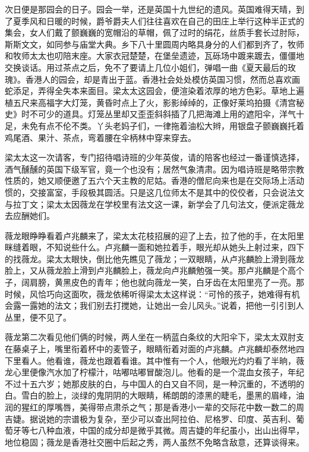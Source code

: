 \par 次日便是那园会的日子。园会一举，还是英国十九世纪的遗风。英国难得天晴，到了夏季风和日暖的时候，爵爷爵夫人们往往喜欢在自己的田庄上举行这种半正式的集会，女人们戴了颤巍巍的宽帽沿的草帽，佩了过时的绢花，丝质手套长过肘际，斯斯文文，如同参与庙堂大典。乡下八十里圆周内略具身分的人们都到齐了，牧师和牧师太太也叨陪末座。大家衣冠楚楚，在堡垒遗迹，瓦砾场中踱来踱去，僵僵地交换谈话。用过茶点之后，免不了要请上几位小姐们，弹唱一曲《夏天最后的玫瑰》。香港人的园会，却是青出于蓝。香港社会处处模仿英国习惯，然而总喜欢画蛇添足，弄得全失本来面目。梁太太这园会，便渲染着浓厚的地方色彩。草地上遍植五尺来高福字大灯笼，黄昏时点上了火，影影绰绰的，正像好莱坞拍摄《清宫秘史》时不可少的道具。灯笼丛里却又歪歪斜斜插了几把海滩上用的遮阳伞，洋气十足，未免有点不伦不类。丫头老妈子们，一律拖着油松大辫，用银盘子颤巍巍托着鸡尾酒、果汁、茶点，弯着腰在伞柄林中穿来穿去。
\par 梁太太这一次请客，专门招待唱诗班的少年英俊，请的陪客也经过一番谨慎选择，酒气醺醺的英国下级军官，竟一个也没有；居然气象清肃。因为唱诗班是略带宗教性质的，她又顺便邀了五六个天主教的尼姑。香港的僧尼向来也是在交际场上活动惯的，交接富室，手段极其圆活。只是这几位师太不是其中的佼佼者，只会说法文与拉丁文；梁太太因薇龙在学校里有法文这一课，新学会了几句法文，便派定薇龙去应酬她们。
\par 薇龙眼睁睁看着卢兆麟来了，梁太太花枝招展的迎了上去，拉了他的手，在太阳里眯缝着眼，不知说些什么。卢兆麟一面和她拉着手，眼光却从她头上射过来，四下的找薇龙。梁太太眼快，倒比他先瞧见了薇龙；一双眼睛，从卢兆麟脸上滑到薇龙脸上，又从薇龙脸上滑到卢兆麟脸上，薇龙向卢兆麟勉强一笑。那卢兆麟是个高个子，阔肩膀，黄黑皮色的青年；他也就向薇龙一笑，白牙齿在太阳里亮了一亮。那时候，风恰巧向这面吹，薇龙依稀听得梁太太这样说：“可怜的孩子，她难得有机会露一露她的法文；我们别去打搅她，让她出一会儿风头。”说着，把他一引引到人丛里，便不见了。
\par 薇龙第二次看见他们俩的时候，两人坐在一柄蓝白条纹的大阳伞下，梁太太双肘支在藤桌子上，嘴里衔着杯中的麦管子，眼睛衔着对面的卢兆麟。卢兆麟却泰然地四下里看人。他看谁，薇龙也跟着看谁。其中惟有一个人，他眼光灼灼看了半晌，薇龙心里便像汽水加了柠檬汁，咕嘟咕嘟冒酸泡儿。他看的是一个混血女孩子，年纪不过十五六岁；她那皮肤的白，与中国人的白又自不同，是一种沉重的，不透明的白。雪白的脸上，淡绿的鬼阴阴的大眼睛，稀朗朗的漆黑的睫毛，墨黑的眉峰，油润的猩红的厚嘴唇，美得带点肃杀之气；那是香港小一辈的交际花中数一数二的周吉婕。据说她的宗谱极为复杂，至少可以查出阿拉伯、尼格罗、印度、英吉利、葡萄牙等七八种血液，中国的成分却是微乎其微。周吉婕的年纪虽小，出山出得早，地位稳固；薇龙是香港社交圈中后起之秀，两人虽然不免略含敌意，还算谈得来。
